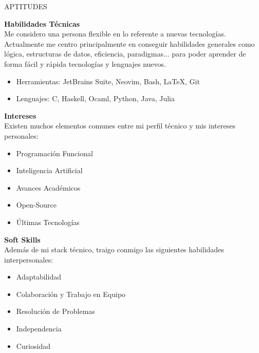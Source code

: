 \documentclass [10pt, a4paper] {extarticle}
\newcommand{\sectionlinethickness} {1.3 pt }
\newcommand{\leftcolumwidth} {0.18 }
\newcommand{\rightcolumwidth}{ 0.82 }
\newcommand {\sectiontitle}[1] {
    \begin {flushleft}
    \begin {minipage}[c]{\leftcolumwidth\textwidth}
        \begin {flushright}
        \!\MakeUppercase {#1}
        \hspace* {10px}
        \end {flushright}
    \end {minipage}
        \begin {tikzpicture}
            \hspace{-4px}
            \draw [line width=\sectionlinethickness, namelines] (1,0) -- (15.363,0);
        \end {tikzpicture}
    \end {flushleft}
}
\begin{document}

    \sectiontitle {aptitudes}

    \begin {flushright}
    \begin {minipage} [t] {\rightcolumwidth\textwidth}

        \textbf {Habilidades Técnicas} \\ [4px]
        Me considero una persona flexible en lo referente a nuevas tecnologías. Actualmente me centro principalmente en conseguir habilidades generales como lógica, estructuras de datos, eficiencia, paradigmas... para poder aprender de forma fácil y rápida tecnologías y lenguajes nuevos.
        \vspace {-2px}
        \begin {itemize} [noitemsep]
            \item Herramientas: JetBrains Suite, Neovim, Bash, LaTeX, Git
            \item Lenguajes: C, Haskell, Ocaml, Python, Java, Julia
        \end {itemize}

        \begin {minipage} [t] {0.475\textwidth}
            \textbf {Intereses} \\ [4px]
            Existen muchos elementos comunes entre mi perfil técnico y mis intereses personales:
            \vspace {-3px}
            \begin {itemize} [noitemsep]
                \item Programación Funcional
                \item Inteligencia Artificial
                \item Avances Académicos
                \item Open-Source
                \item Últimas Tecnologías
            \end {itemize}
        \end {minipage}
        \hfill
        \begin {minipage} [t] {0.475\textwidth}
            \textbf {Soft Skills} \\ [4px]
            Además de mi stack técnico, traigo conmigo las siguientes habilidades interpersonales:
            \vspace {-3px}
            \begin {itemize} [noitemsep]
                \item Adaptabilidad
                \item Colaboración y Trabajo en Equipo
                \item Resolución de Problemas
                \item Independencia
                \item Curiosidad
            \end {itemize}
        \end {minipage}
    \end {minipage}
    \end {flushright}
\end{document}
